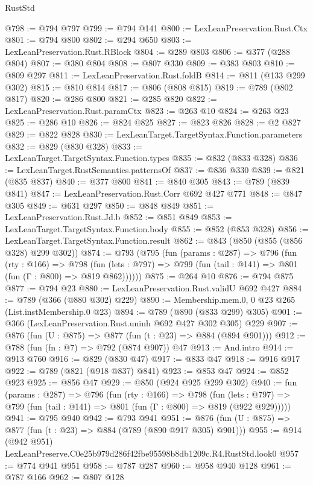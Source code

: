 \begin{lexlean}{RustStd}
\begin{coremodule}
@798 := @794 @797
@799 := @794 @141
@800 := LexLeanPreservation.Rust.Ctx
@801 := @794 @800
@802 := @294 @650
@803 := LexLeanPreservation.Rust.RBlock
@804 := @289 @803
@806 := @377 (@288 @804)
@807 := @380 @804
@808 := @807 @330
@809 := @383 @803
@810 := @809 @297
@811 := LexLeanPreservation.Rust.foldB
@814 := @811 (@133 @299 @302)
@815 := @810 @814
@817 := @806 (@808 @815)
@819 := @789 (@802 @817)
@820 := @286 @800
@821 := @285 @820
@822 := LexLeanPreservation.Rust.paramCtx
@823 := @263 @10
@824 := @263 @23
@825 := @286 @10
@826 := @824 @825
@827 := @823 @826
@828 := @2 @827
@829 := @822 @828
@830 := LexLeanTarget.TargetSyntax.Function.parameters
@832 := @829 (@830 @328)
@833 := LexLeanTarget.TargetSyntax.Function.types
@835 := @832 (@833 @328)
@836 := LexLeanTarget.RustSemantics.patternsOf
@837 := @836 @330
@839 := @821 (@835 @837)
@840 := @377 @800
@841 := @840 @305
@843 := @789 (@839 @841)
@847 := LexLeanPreservation.Rust.Corr @692 @427 @771
@848 := @847 @305
@849 := @631 @297
@850 := @848 @849
@851 := LexLeanPreservation.Rust.Jd.b
@852 := @851 @849
@853 := LexLeanTarget.TargetSyntax.Function.body
@855 := @852 (@853 @328)
@856 := LexLeanTarget.TargetSyntax.Function.result
@862 := @843 (@850 (@855 (@856 @328) @299 @302))
@874 := @793
    (@795
      (fun (params : @287) =>
      @796
        (fun (rty : @166) =>
        @798
          (fun (lets : @797) => @799 (fun (tail : @141) => @801 (fun (Γ : @800) => @819 @862))))))
@875 := @264 @10
@876 := @794 @875
@877 := @794 @23
@880 := LexLeanPreservation.Rust.validU @692 @427
@884 := @789 (@366 (@880 @302) @229)
@890 := Membership.mem.{0, 0} @23 @265 (List.instMembership.{0} @23)
@894 := @789 (@890 (@833 @299) @305)
@901 := @366 (LexLeanPreservation.Rust.uninh @692 @427 @302 @305) @229
@907 := @876 (fun (U : @875) => @877 (fun (t : @23) => @884 (@894 @901)))
@912 := @788 (fun (fn : @7) => @792 (@874 @907)) @47
@913 := And.intro
@914 := @913 @760
@916 := @829 (@830 @47)
@917 := @833 @47
@918 := @916 @917
@922 := @789 (@821 (@918 @837) @841)
@923 := @853 @47
@924 := @852 @923
@925 := @856 @47
@929 := @850 (@924 @925 @299 @302)
@940 := fun (params : @287) =>
  @796
    (fun (rty : @166) =>
    @798
      (fun (lets : @797) => @799 (fun (tail : @141) => @801 (fun (Γ : @800) => @819 (@922 @929)))))
@941 := @795 @940
@942 := @793 @941
@951 := @876 (fun (U : @875) => @877 (fun (t : @23) => @884 (@789 (@890 @917 @305) @901)))
@955 := @914 (@942 @951) LexLeanPreserve.C0e25b979d286f42fbe95598b8db1209c.R4.RustStd.look0
@957 := @774 @941 @951
@958 := @787 @287
@960 := @958 @940 @128
@961 := @787 @166
@962 := @807 @128

\end{coremodule}
\end{lexlean}
